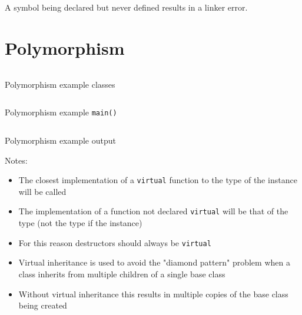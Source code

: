 \documentclass[a4paper]{article}
\begin{document}
A symbol being declared but never defined results in a linker error.

\section{Polymorphism}

\begin{listing}[h!]
  \inputminted[linenos,frame=lines,firstline=5,lastline=31]{cpp}{listings/polymorphism_1.cpp}
  \caption{Polymorphism example classes}
  \label{listing:polymorphism_1}
\end{listing}
\FloatBarrier

\begin{listing}[h!]
  \inputminted[linenos,frame=lines,firstline=33]{cpp}{listings/polymorphism_1.cpp}
  \caption{Polymorphism example \texttt{main()}}
  \label{listing:polymorphism_1_main}
\end{listing}
\FloatBarrier

\begin{listing}[h!]
  \inputminted[linenos,frame=lines]{text}{out/polymorphism_1.txt}
  \caption{Polymorphism example output}
  \label{listing:polymorphism_1_out}
\end{listing}
\FloatBarrier

Notes:

\begin{itemize}
  \item The closest implementation of a \texttt{virtual} function to the type of
        the instance will be called
  \item The implementation of a function not declared \texttt{virtual} will be
        that of the type (not the type if the instance)
  \item For this reason destructors should always be \texttt{virtual}
  \item Virtual inheritance is used to avoid the "diamond pattern" problem when
        a class inherits from multiple children of a single base class
  \item Without virtual inheritance this results in multiple copies of the base
        class being created
\end{itemize}
\end{document}
